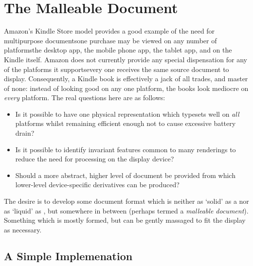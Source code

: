 \cleardoublepage
\chapter{The Malleable Document}\label{ch:malleable}  %



Amazon's Kindle Store model provides a good example of the need for multipurpose documents\ed one
purchase may be viewed on any number of platforms\ed the desktop app, the mobile phone app, the
tablet app, and on the Kindle itself. Amazon does not currently provide any special dispensation for
any of the platforms it supports\ed every one receives the same source document to display.
Consequently, a Kindle book is effectively a jack of all trades, and master of none: instead of
looking good on any one platform, the books look mediocre on \emph{every} platform. The real
questions here are as follows:

\begin{itemize}
 \item Is it possible to have one physical representation which typesets well on \emph{all}
platforms whilst remaining efficient enough not to cause excessive battery drain?
 \item Is it possible to identify invariant features common to many renderings to reduce the need
for processing on the display device?
 \item Should a more abstract, higher level of document be provided from which lower-level
device-specific derivatives can be produced?
\end{itemize}
  
The desire is to develop some document format which is neither as `solid' as a \pdf{} nor as
`liquid' as \html{}, but somewhere in between (perhaps termed a \emph{malleable document}).
Something which is mostly formed, but can be gently massaged to fit the display as necessary.


\section{A Simple Implemenation}


